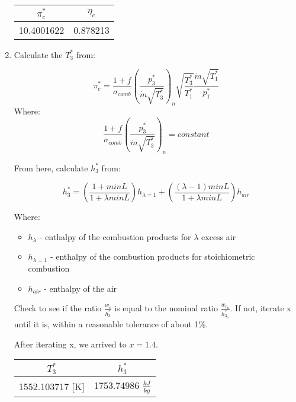 \documentclass[titlepage]{article}
\begin{document}
\begin{enumerate}
  \begin{center}
    \begin{tabular}{|c|c|}
      \hline
      $\pi_{c}^{*}$ & $\eta_{c}$ \\
      \hline
      10.4001622 & 0.878213 \\
      \hline
    \end{tabular}
  \end{center}
  \item Calculate the $T_{3}^{*}$ from:
  
  \begin{equation}
    \pi_{c}^{*} = \frac{1+f}{\sigma_{comb}} \left( \frac{p_{3}^{*}}{\dot{m}\sqrt{T_{3}^{*}}} \right)_{n}
    \sqrt{\frac{T_{3}^{*}}{T_{1}^{*}}} \frac{\dot{m}\sqrt{T_{1}^{*}}}{p_{1}^{*}}
  \end{equation}
  Where:
  \begin{equation}
    \frac{1+f}{\sigma_{comb}} \left( \frac{p_{3}^{*}}{\dot{m}\sqrt{T_{3}^{*}}} \right)_{n} = constant
  \end{equation}
  
  From here, calculate $h_{3}^{*}$ from:

  \begin{equation}
    h_{3}^{*} = \left(\frac{1+minL}{1+\lambda minL}\right) h_{\lambda =1} + \left(\frac{(\lambda -1) minL}{1+\lambda minL}\right) h_{air}
  \end{equation}

  Where:
  \begin{itemize}
    \item $h_{\lambda}$ - enthalpy of the combustion products for $\lambda$ excess air
    \item $h_{\lambda =1}$ - enthalpy of the combustion products for stoichiometric combustion
    \item $h_{air}$ - enthalpy of the air
  \end{itemize}

  Check to see if the ratio $\frac{w_{c}}{h_{3}^{*}}$ is equal to the nominal ratio
  $\frac{w_{c_{n}}}{h_{3_{n}}^{*}}$. If not, iterate x until it is, within a reasonable tolerance of about 1\%.

  \vspace{0.5cm}

  After iterating x, we arrived to $x = 1.4$.

  \begin{center}
    \begin{tabular}{|c|c|}
      \hline
      $T_{3}^{*}$ & $h_{3}^{*}$ \\
      \hline
      1552.103717 [K] & 1753.74986 $\frac{kJ}{kg}$ \\
      \hline
    \end{tabular}
  \end{center}


\end{enumerate}
\end{document}
